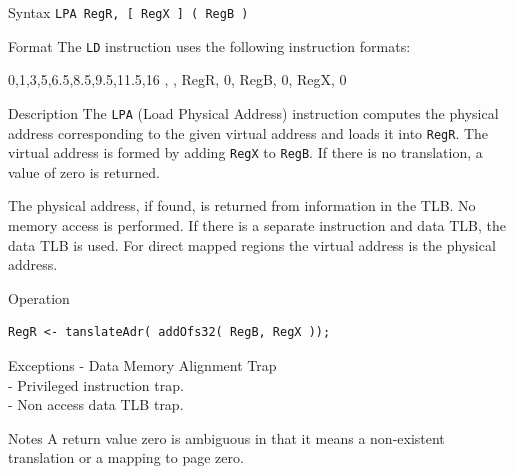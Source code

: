%
%
\pagebreak
{}

\begin{iPageDescEntry}{Syntax}
    \texttt{LPA RegR, [ RegX ] ( RegB )}
\end{iPageDescEntry}

\begin{iPageDescEntry}{Format}
    The \texttt{LD} instruction uses the following instruction formats: \\

    \begin{flushleft}
    \drawInstrFormat
        {0,1,3,5,6.5,8.5,9.5,11.5,16}
        {\OpCodeGrpSYS, \OpCodeLPA, RegR, 0, RegB, 0, RegX, 0}
    \end{flushleft}
\end{iPageDescEntry}

\begin{iPageDescEntry}{Description}
    The \texttt{LPA} (Load Physical Address) instruction computes the physical 
    address corresponding to the given virtual address and loads it into \texttt{RegR}. The virtual address is formed by adding \texttt{RegX} to \texttt{RegB}. If there is no translation, a value of zero is returned. 

    The physical address, if found, is returned from information in the TLB.  No memory access is performed. If there is a separate instruction and data TLB, the data TLB is used. For direct mapped regions the virtual address is the physical address.
    
\end{iPageDescEntry}

\begin{iPageDescOpEntry}{Operation}
\begin{lstlisting}[style=iPageOpStyle]
RegR <- tanslateAdr( addOfs32( RegB, RegX ));
\end{lstlisting}
\end{iPageDescOpEntry}

\begin{iPageDescEntry}{Exceptions}
	- Data Memory Alignment Trap \\
    - Privileged instruction trap. \\
    - Non access data TLB trap.
\end{iPageDescEntry}

\begin{iPageDescEntry}{Notes}
A return value zero is ambiguous in that it means a non-existent translation or a mapping to page zero.    
\end{iPageDescEntry}
